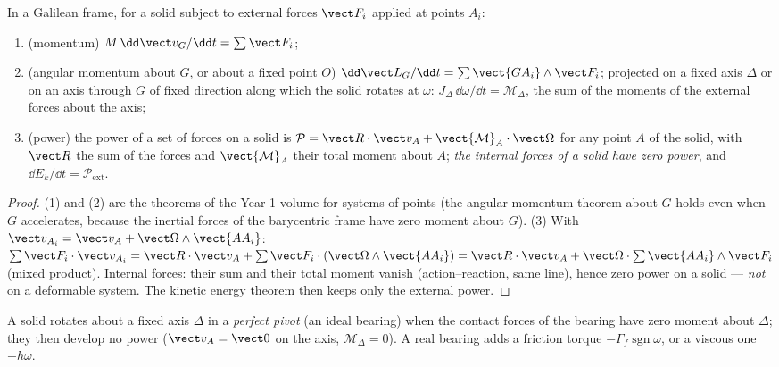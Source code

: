 \begin{theorem}\label{thm:b2:rigid-body-mechanics:laws}
In a Galilean frame, for a solid subject to external forces $\vect F_i$
applied at points $A_i$:
\begin{enumerate}
  \item (momentum) $M\,\dd\vect v_G/\dd t = \sum\vect F_i$;
  \item (angular momentum about $G$, or about a fixed point $O$)
        $\dd\vect L_G/\dd t = \sum\vect{GA_i}\wedge\vect F_i$; projected on
        a fixed axis $\Delta$ or on an axis through $G$ of fixed
        direction along which the solid rotates at $\omega$:
        $J_\Delta\,\dd\omega/\dd t = \mathcal M_\Delta$, the sum of the
        moments of the external forces about the axis;
  \item (power) the power of a set of forces on a solid is
        $\mathcal P = \vect R\cdot\vect v_A + \vect{\mathcal M}_A\cdot
        \vect\Omega$ for any point $A$ of the solid, with $\vect R$ the
        sum of the forces and $\vect{\mathcal M}_A$ their total moment
        about $A$; \emph{the internal forces of a solid have zero
        power}, and $\dd E_k/\dd t = \mathcal P_{\text{ext}}$.
\end{enumerate}
\end{theorem}

\begin{proof}
(1) and (2) are the theorems of the Year 1 volume for systems of points
(the angular momentum theorem about $G$ holds even when $G$
accelerates, because the inertial forces of the barycentric frame have
zero moment about $G$). (3) With $\vect v_{A_i} = \vect v_A + \vect\Omega
\wedge\vect{AA_i}$: $\sum\vect F_i\cdot\vect v_{A_i} = \vect R\cdot\vect v_A
+ \sum\vect F_i\cdot(\vect\Omega\wedge\vect{AA_i}) = \vect R\cdot\vect v_A +
\vect\Omega\cdot\sum\vect{AA_i}\wedge\vect F_i$ (mixed product). Internal
forces: their sum and their total moment vanish (action--reaction, same
line), hence zero power on a solid --- \emph{not} on a deformable
system. The kinetic energy theorem then keeps only the external power.
\end{proof}

\begin{definition}\label{def:b2:rigid-body-mechanics:pivot}
A solid rotates about a fixed axis $\Delta$ in a \emph{perfect pivot}
(an ideal bearing) when the contact forces of the bearing have zero
moment about $\Delta$; they then develop no power ($\vect v_A = \vect 0$
on the axis, $\mathcal M_\Delta = 0$). A real bearing adds a friction
torque $-\Gamma_f\operatorname{sgn}\omega$, or a viscous one $-h\omega$.
\end{definition}

